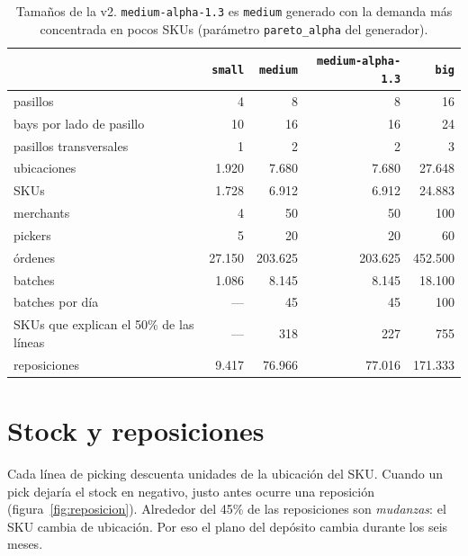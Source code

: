 \documentclass[11pt,a4paper,oneside]{report}
\newcommand{\code}[1]{\texttt{\small #1}}
\begin{document}
\begin{table}[ht]
\centering\small
\begin{tabular}{@{}lrrrr@{}}
\toprule
 & \code{small} & \code{medium} & \code{medium-alpha-1.3} & \code{big} \\
\midrule
pasillos & 4 & 8 & 8 & 16 \\
bays por lado de pasillo & 10 & 16 & 16 & 24 \\
pasillos transversales & 1 & 2 & 2 & 3 \\
ubicaciones & 1.920 & 7.680 & 7.680 & 27.648 \\
SKUs & 1.728 & 6.912 & 6.912 & 24.883 \\
merchants & 4 & 50 & 50 & 100 \\
pickers & 5 & 20 & 20 & 60 \\
órdenes & 27.150 & 203.625 & 203.625 & 452.500 \\
batches & 1.086 & 8.145 & 8.145 & 18.100 \\
batches por día & --- & 45 & 45 & 100 \\
SKUs que explican el 50\% de las líneas & --- & 318 & 227 & 755 \\
reposiciones & 9.417 & 76.966 & 77.016 & 171.333 \\
\bottomrule
\end{tabular}
\caption{Tamaños de la v2. \code{medium-alpha-1.3} es \code{medium} generado con la demanda
más concentrada en pocos SKUs (parámetro \code{pareto\_alpha} del generador).}
\label{tab:tamanos}
\end{table}

\section{Stock y reposiciones}

Cada línea de picking descuenta unidades de la ubicación del SKU. Cuando un pick dejaría el
stock en negativo, justo antes ocurre una reposición (figura~\ref{fig:reposicion}). Alrededor
del 45\% de las reposiciones son \emph{mudanzas}: el SKU cambia de ubicación. Por eso el
plano del depósito cambia durante los seis meses.
\end{document}
